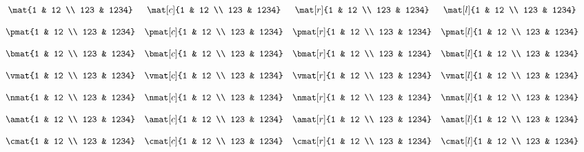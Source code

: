 \documentclass{standalone}
\begin{document}
\(\begin{array}{ccccc}
\\\\%
&	\mat{1 & 12 \\ 123 & 1234}
&	\mat[c]{1 & 12 \\ 123 & 1234}
&	\mat[r]{1 & 12 \\ 123 & 1234}
&	\mat[l]{1 & 12 \\ 123 & 1234}
\\\\%
&	\pmat{1 & 12 \\ 123 & 1234}
&	\pmat[c]{1 & 12 \\ 123 & 1234}
&	\pmat[r]{1 & 12 \\ 123 & 1234}
&	\pmat[l]{1 & 12 \\ 123 & 1234}
\\\\%
&	\bmat{1 & 12 \\ 123 & 1234}
&	\bmat[c]{1 & 12 \\ 123 & 1234}
&	\bmat[r]{1 & 12 \\ 123 & 1234}
&	\bmat[l]{1 & 12 \\ 123 & 1234}
\\\\%
&	\vmat{1 & 12 \\ 123 & 1234}
&	\vmat[c]{1 & 12 \\ 123 & 1234}
&	\vmat[r]{1 & 12 \\ 123 & 1234}
&	\vmat[l]{1 & 12 \\ 123 & 1234}
\\\\%
&	\nmat{1 & 12 \\ 123 & 1234}
&	\nmat[c]{1 & 12 \\ 123 & 1234}
&	\nmat[r]{1 & 12 \\ 123 & 1234}
&	\nmat[l]{1 & 12 \\ 123 & 1234}
\\\\%
&	\amat{1 & 12 \\ 123 & 1234}
&	\amat[c]{1 & 12 \\ 123 & 1234}
&	\amat[r]{1 & 12 \\ 123 & 1234}
&	\amat[l]{1 & 12 \\ 123 & 1234}
\\\\%
&	\cmat{1 & 12 \\ 123 & 1234}
&	\cmat[c]{1 & 12 \\ 123 & 1234}
&	\cmat[r]{1 & 12 \\ 123 & 1234}
&	\cmat[l]{1 & 12 \\ 123 & 1234}
\\\\%
\end{array}\)
\end{document}
